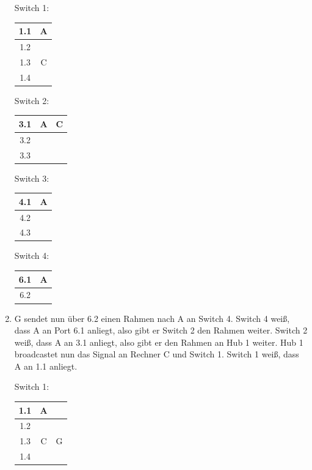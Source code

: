 \documentclass[12pt, a4paper]{article}
\begin{document}
\begin{enumerate}[label=\arabic*.]
			Switch 1:
			\begin{center}
				\begin{tabular}{c|c}
					1.1 & A \\
					\hline
					1.2 \\
					\hline
					1.3 & C \\
					\hline
					1.4 \\
				\end{tabular}
			\end{center}
			
			Switch 2:
			\begin{center}
				\begin{tabular}{c|c c}
					3.1 & A & C \\
					\hline
					3.2 \\
					\hline
					3.3 \\
				\end{tabular}
			\end{center}
			
			Switch 3:
			\begin{center}
				\begin{tabular}{c|c}
					4.1 & A \\
					\hline
					4.2 \\
					\hline
					4.3 \\
				\end{tabular}
			\end{center}
			
			Switch 4:
			\begin{center}
				\begin{tabular}{c|c}
					6.1 & A \\
					\hline
					6.2 \\
				\end{tabular}
			\end{center}
	
	\item	G sendet nun über 6.2 einen Rahmen nach A an Switch 4. Switch 4 weiß, dass A an Port 6.1 anliegt, also gibt er Switch 2 den Rahmen weiter. Switch 2 weiß, dass A an 3.1 anliegt, also gibt er den Rahmen an Hub 1 weiter. Hub 1 broadcastet nun das Signal an Rechner C und Switch 1. Switch 1 weiß, dass A an 1.1 anliegt.
			
			Switch 1:
			\begin{center}
				\begin{tabular}{c|c c}
					1.1 & A \\
					\hline
					1.2 \\
					\hline
					1.3 & C & G \\
					\hline
					1.4 \\
				\end{tabular}
			\end{center}
			

\end{enumerate}
\end{document}
